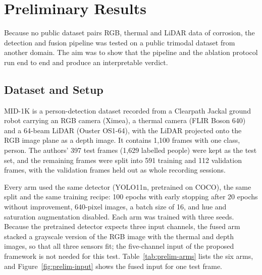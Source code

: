 \section{Preliminary Results}
\label{sec:preliminary-results}

Because no public dataset pairs RGB, thermal and LiDAR data of corrosion, the
detection and fusion pipeline was tested on a public trimodal dataset from
another domain. The aim was to show that the pipeline and the ablation protocol
run end to end and produce an interpretable verdict.

\subsection{Dataset and Setup}

MID-1K \citep{Mota2024} is a person-detection dataset recorded from a Clearpath
Jackal ground robot carrying an RGB camera (Ximea), a thermal camera (FLIR Boson
640) and a 64-beam LiDAR (Ouster OS1-64), with the LiDAR projected onto the RGB
image plane as a depth image. It contains 1,100 frames with one class, person.
The authors' 397 test frames (1,629 labelled people) were kept as the test set,
and the remaining frames were split into 591 training and 112 validation frames,
with the validation frames held out as whole recording sessions.

Every arm used the same detector (YOLO11n, pretrained on COCO), the same split
and the same training recipe: 100 epochs with early stopping after 20 epochs
without improvement, 640-pixel images, a batch size of 16, and hue and
saturation augmentation disabled. Each arm was trained with three seeds. Because
the pretrained detector expects three input channels, the fused arm stacked a
grayscale version of the RGB image with the thermal and depth images, so that
all three sensors fit; the five-channel input of the proposed framework is not
needed for this test. Table~\ref{tab:prelim-arms} lists the six arms, and Figure~\ref{fig:prelim-input} shows the fused input
for one test frame.


